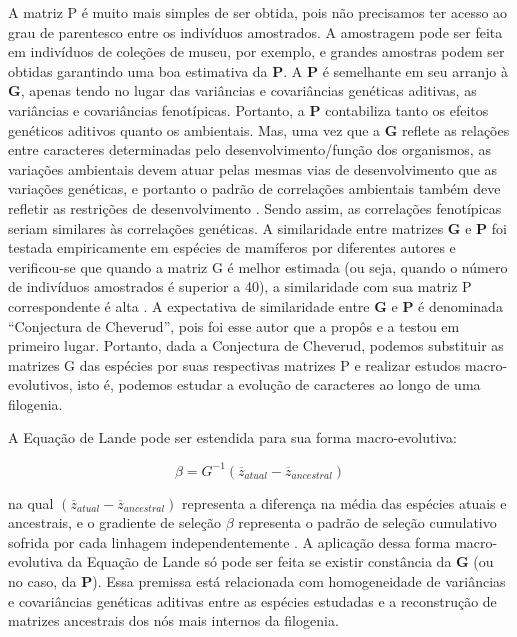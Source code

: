 \documentclass[portuges,]{tufte-handout}
\begin{document}
A matriz P é muito mais simples de ser obtida, pois não precisamos ter
acesso ao grau de parentesco entre os indivíduos amostrados. A
amostragem pode ser feita em indivíduos de coleções de museu, por
exemplo, e grandes amostras podem ser obtidas garantindo uma boa
estimativa da \(\mathbf{P}\). A \(\mathbf{P}\) é semelhante em seu
arranjo à \(\mathbf{G}\), apenas tendo no lugar das variâncias e
covariâncias genéticas aditivas, as variâncias e covariâncias
fenotípicas. Portanto, a \(\mathbf{P}\) contabiliza tanto os efeitos
genéticos aditivos quanto os ambientais. Mas, uma vez que a
\(\mathbf{G}\) reflete as relações entre caracteres determinadas pelo
desenvolvimento/função dos organismos, as variações ambientais devem
atuar pelas mesmas vias de desenvolvimento que as variações genéticas, e
portanto o padrão de correlações ambientais também deve refletir as
restrições de desenvolvimento \cite{Cheverud1984}. Sendo assim, as
correlações fenotípicas seriam similares às correlações genéticas. A
similaridade entre matrizes \(\mathbf{G}\) e \(\mathbf{P}\) foi testada
empiricamente em espécies de mamíferos por diferentes autores e
verificou-se que quando a matriz G é melhor estimada (ou seja, quando o
número de indivíduos amostrados é superior a 40), a similaridade com sua
matriz P correspondente é alta \cite{Cheverud1988}. A expectativa de
similaridade entre \(\mathbf{G}\) e \(\mathbf{P}\) é denominada
``Conjectura de Cheverud'', pois foi esse autor que a propôs e a testou
em primeiro lugar. Portanto, dada a Conjectura de Cheverud, podemos
substituir as matrizes G das espécies por suas respectivas matrizes P e
realizar estudos macro-evolutivos, isto é, podemos estudar a evolução de
caracteres ao longo de uma filogenia.

A Equação de Lande pode ser estendida para sua forma macro-evolutiva:

\[
\beta = G^{-1} (\overline z_{atual} - \overline z_{ancestral})
\]

na qual \((\overline z_{atual} - \overline z_{ancestral})\) representa a
diferença na média das espécies atuais e ancestrais, e o gradiente de
seleção \(\beta\) representa o padrão de seleção cumulativo sofrida por
cada linhagem independentemente \cite{Marroig2005}. A aplicação
dessa forma macro-evolutiva da Equação de Lande só pode ser feita se
existir constância da \(\mathbf{G}\) (ou no caso, da \(\mathbf{P}\)).
Essa premissa está relacionada com homogeneidade de variâncias e
covariâncias genéticas aditivas entre as espécies estudadas e a
reconstrução de matrizes ancestrais dos nós mais internos da filogenia.
\end{document}
